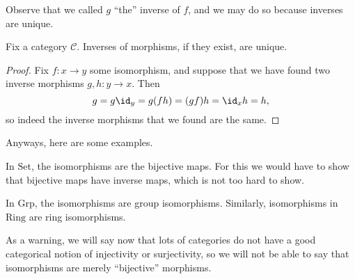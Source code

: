 \documentclass[../notes.tex]{subfiles}
\begin{document}
Observe that we called $g$ ``the'' inverse of $f$, and we may do so because inverses are unique.
\begin{proposition}
	Fix a category $\mathcal C$. Inverses of morphisms, if they exist, are unique.
\end{proposition}
\begin{proof}
	Fix $f:x\to y$ some isomorphism, and suppose that we have found two inverse morphisms $g,h:y\to x$. Then
	\[g=g\id_y=g(fh)=(gf)h=\id_xh=h,\]
	so indeed the inverse morphisms that we found are the same.
\end{proof}
Anyways, here are some examples.
\begin{example}
	In $\mathrm{Set}$, the isomorphisms are the bijective maps. For this we would have to show that bijective maps have inverse maps, which is not too hard to show.
\end{example}
\begin{example}
	In $\mathrm{Grp}$, the isomorphisms are group isomorphisms. Similarly, isomorphisms in $\mathrm{Ring}$ are ring isomorphisms.
\end{example}
As a warning, we will say now that lots of categories do not have a good categorical notion of injectivity or surjectivity, so we will not be able to say that isomorphisms are merely ``bijective'' morphisms.
\end{document}
